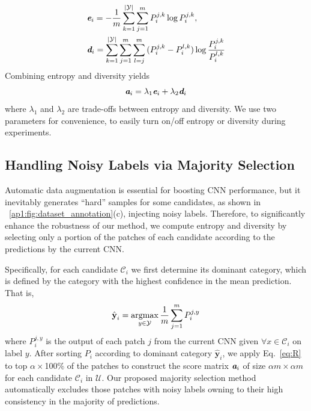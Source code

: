 \begin{equation}
\label{eq:active_criteria}
\begin{split}
&\textbf{\em e}_i = -\frac{1}{m}\sum_{k=1}^{|\mathcal{Y}|}{\sum_{j=1}^{m}{P_i^{j,k}\log{P_i^{j,k}}}}, \\
&\textbf{\em d}_i = \sum_{k=1}^{|\mathcal{Y}|}{\sum_{j=1}^m{\sum_{l=j}^m{(P_i^{j,k}-P_i^{l,k})\log{\frac{P_i^{j,k}}{P_i^{l,k}}}}}}
\end{split}
\end{equation}
Combining entropy and diversity yields
\begin{equation}
\label{eq:R}
\textbf{\em a}_i =\lambda_1 \textbf{\em e}_i+\lambda_2 \textbf{\em d}_i
\end{equation}
where $\lambda_1$ and $\lambda_2$ are trade-offs between entropy and diversity. We use two parameters for convenience,  to easily turn on/off entropy or diversity during experiments.




\subsection{Handling Noisy Labels via Majority Selection}
\label{ch3:approach_property:handling_noisy_labels_majority_selection}

Automatic data augmentation is essential for boosting CNN performance, but it inevitably generates ``hard'' samples for some candidates, as shown in \figurename~\ref{ap1:fig:dataset_annotation}(c), injecting noisy labels. Therefore, to significantly enhance the robustness of our method, we compute entropy and diversity by selecting only a portion of the patches of each candidate according to the predictions by the current CNN.

Specifically, for each candidate $\mathcal{C}_i$ we first determine its dominant category, which is defined by the category with the highest confidence in the mean prediction. That is,
\begin{equation}
\label{eq:dominate_class}
\hat{\textbf{y}}_i =  \operatorname*{argmax}_{y \in \mathcal{Y}} \frac{1}{m}\sum_{j=1}^{m}P^{j,y}_i
\end{equation}
where $P^{j,y}_i$ is the output of each patch $j$ from the current CNN given $\forall x \in \mathcal{C}_i$ on label $y$. After sorting $P_i$ according to dominant category $\hat{\textbf{y}}_i$, we apply Eq.~\ref{eq:R} to top $\alpha\times$100\% of the patches to construct the score matrix $\textbf{\em a}_i$ of size $\alpha m \times \alpha m$ for each candidate $\mathcal{C}_i$ in $\mathcal{U}$. Our proposed majority selection method automatically excludes those patches with noisy labels owning to their high consistency in the majority of predictions.

